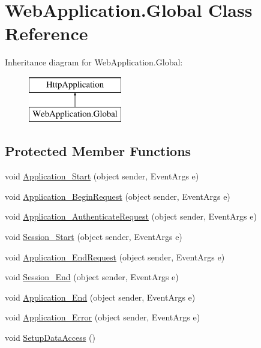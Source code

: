 \hypertarget{classWebApplication_1_1Global}{}\section{Web\+Application.\+Global Class Reference}
\label{classWebApplication_1_1Global}
Inheritance diagram for Web\+Application.\+Global\+:\begin{figure}[H]
\begin{center}
\leavevmode
\includegraphics[height=2.000000cm]{d3/dde/classWebApplication_1_1Global}
\end{center}
\end{figure}
\subsection*{Protected Member Functions}
\begin{DoxyCompactItemize}
\item 
void \mbox{\hyperlink{classWebApplication_1_1Global_a138ffd46dafd12c3e22b7bc70c4e4238}{Application\+\_\+\+Start}} (object sender, Event\+Args e)
\item 
void \mbox{\hyperlink{classWebApplication_1_1Global_a6beaa413614692ccc4ab10e88e8e79dc}{Application\+\_\+\+Begin\+Request}} (object sender, Event\+Args e)
\item 
void \mbox{\hyperlink{classWebApplication_1_1Global_ab7065c8aecde7ca74325357b33723444}{Application\+\_\+\+Authenticate\+Request}} (object sender, Event\+Args e)
\item 
void \mbox{\hyperlink{classWebApplication_1_1Global_ab2e5cb6155c6759fc0d1a87d7df1668c}{Session\+\_\+\+Start}} (object sender, Event\+Args e)
\item 
void \mbox{\hyperlink{classWebApplication_1_1Global_a15b45cf091e77a29996c90eb2fe654d5}{Application\+\_\+\+End\+Request}} (object sender, Event\+Args e)
\item 
void \mbox{\hyperlink{classWebApplication_1_1Global_ac730b53f2e5ac5b5981b2aabd4cdad1a}{Session\+\_\+\+End}} (object sender, Event\+Args e)
\item 
void \mbox{\hyperlink{classWebApplication_1_1Global_af6bb6f95cbdc73674cc60a1ca1766153}{Application\+\_\+\+End}} (object sender, Event\+Args e)
\item 
void \mbox{\hyperlink{classWebApplication_1_1Global_aa2a58f064cba7da992438a63d881724a}{Application\+\_\+\+Error}} (object sender, Event\+Args e)
\item 
void \mbox{\hyperlink{classWebApplication_1_1Global_a51f7c694be3dcc6ebd0a1ed4d6b6c337}{Setup\+Data\+Access}} ()
\end{DoxyCompactItemize}


